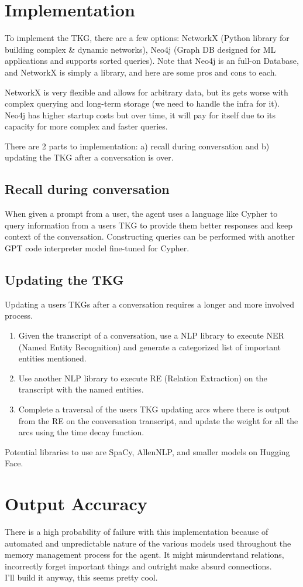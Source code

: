 \documentclass{article}
\begin{document}
\section{Implementation}
To implement the TKG, there are a few options: NetworkX (Python library for building complex \& dynamic networks), Neo4j (Graph DB designed for ML applications and supports sorted queries). Note that Neo4j is an full-on Database, and NetworkX is simply a library, and here are some pros and cons to each.

NetworkX is very flexible and allows for arbitrary data, but its gets worse with complex querying and long-term storage (we need to handle the infra for it). Neo4j has higher startup costs but over time, it will pay for itself due to its capacity for more complex and faster queries.

There are 2 parts to implementation: a) recall during conversation and b) updating the TKG after a conversation is over.

\subsection{Recall during conversation}
When given a prompt from a user, the agent uses a language like Cypher to query information from a users TKG to provide them better responses and keep context of the conversation. Constructing queries can be performed with another GPT code interpreter model fine-tuned for Cypher.

\subsection{Updating the TKG}
Updating a users TKGs after a conversation requires a longer and more involved process.

\begin{enumerate}
	\item Given the transcript of a conversation, use a NLP library to execute NER (Named Entity Recognition) and generate a categorized list of important entities mentioned.
	\item Use another NLP library to execute RE (Relation Extraction) on the transcript with the named entities.
	\item Complete a traversal of the users TKG updating arcs where there is output from the RE on the conversation transcript, and update the weight for all the arcs using the time decay function.
\end{enumerate}

Potential libraries to use are SpaCy, AllenNLP, and smaller models on Hugging Face.

\section{Output Accuracy}
There is a high probability of failure with this implementation because of automated and unpredictable nature of the various models used throughout the memory management process for the agent. It might misunderstand relations, incorrectly forget important things and outright make absurd connections. \\

I'll build it anyway, this seems pretty cool.
\end{document}
